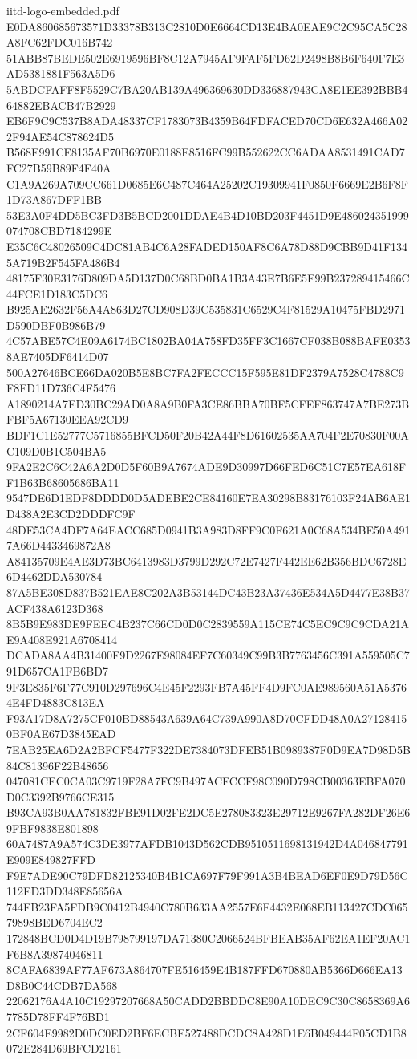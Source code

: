 \begin{filecontents*}[overwrite]{iitd-logo-embedded.pdf}
E0DA860685673571D33378B313C2810D0E6664CD13E4BA0EAE9C2C95CA5C28A8FC62FDC016B742
51ABB87BEDE502E6919596BF8C12A7945AF9FAF5FD62D2498B8B6F640F7E3AD5381881F563A5D6
5ABDCFAFF8F5529C7BA20AB139A496369630DD336887943CA8E1EE392BBB464882EBACB47B2929
EB6F9C9C537B8ADA48337CF1783073B4359B64FDFACED70CD6E632A466A022F94AE54C878624D5
B568E991CE8135AF70B6970E0188E8516FC99B552622CC6ADAA8531491CAD7FC27B59B89F4F40A
C1A9A269A709CC661D0685E6C487C464A25202C19309941F0850F6669E2B6F8F1D73A867DFF1BB
53E3A0F4DD5BC3FD3B5BCD2001DDAE4B4D10BD203F4451D9E486024351999074708CBD7184299E
E35C6C48026509C4DC81AB4C6A28FADED150AF8C6A78D88D9CBB9D41F1345A719B2F545FA486B4
48175F30E3176D809DA5D137D0C68BD0BA1B3A43E7B6E5E99B237289415466C44FCE1D183C5DC6
B925AE2632F56A4A863D27CD908D39C535831C6529C4F81529A10475FBD2971D590DBF0B986B79
4C57ABE57C4E09A6174BC1802BA04A758FD35FF3C1667CF038B088BAFE03538AE7405DF6414D07
500A27646BCE66DA020B5E8BC7FA2FECCC15F595E81DF2379A7528C4788C9F8FD11D736C4F5476
A1890214A7ED30BC29AD0A8A9B0FA3CE86BBA70BF5CFEF863747A7BE273BFBF5A67130EEA92CD9
BDF1C1E52777C5716855BFCD50F20B42A44F8D61602535AA704F2E70830F00AC109D0B1C504BA5
9FA2E2C6C42A6A2D0D5F60B9A7674ADE9D30997D66FED6C51C7E57EA618FF1B63B68605686BA11
9547DE6D1EDF8DDDD0D5ADEBE2CE84160E7EA30298B83176103F24AB6AE1D438A2E3CD2DDDFC9F
48DE53CA4DF7A64EACC685D0941B3A983D8FF9C0F621A0C68A534BE50A4917A66D4433469872A8
A84135709E4AE3D73BC6413983D3799D292C72E7427F442EE62B356BDC6728E6D4462DDA530784
87A5BE308D837B521EAE8C202A3B53144DC43B23A37436E534A5D4477E38B37ACF438A6123D368
8B5B9E983DE9FEEC4B237C66CD0D0C2839559A115CE74C5EC9C9C9CDA21AE9A408E921A6708414
DCADA8AA4B31400F9D2267E98084EF7C60349C99B3B7763456C391A559505C791D657CA1FB6BD7
9F3E835F6F77C910D297696C4E45F2293FB7A45FF4D9FC0AE989560A51A53764E4FD4883C813EA
F93A17D8A7275CF010BD88543A639A64C739A990A8D70CFDD48A0A271284150BF0AE67D3845EAD
7EAB25EA6D2A2BFCF5477F322DE7384073DFEB51B0989387F0D9EA7D98D5B84C81396F22B48656
047081CEC0CA03C9719F28A7FC9B497ACFCCF98C090D798CB00363EBFA070D0C3392B9766CE315
B93CA93B0AA781832FBE91D02FE2DC5E278083323E29712E9267FA282DF26E69FBF9838E801898
60A7487A9A574C3DE3977AFDB1043D562CDB9510511698131942D4A046847791E909E849827FFD
F9E7ADE90C79DFD82125340B4B1CA697F79F991A3B4BEAD6EF0E9D79D56C112ED3DD348E85656A
744FB23FA5FDB9C0412B4940C780B633AA2557E6F4432E068EB113427CDC06579898BED6704EC2
172848BCD0D4D19B798799197DA71380C2066524BFBEAB35AF62EA1EF20AC1F6B8A39874046811
8CAFA6839AF77AF673A864707FE516459E4B187FFD670880AB5366D666EA13D8B0C44CDB7DA568
22062176A4A10C19297207668A50CADD2BBDDC8E90A10DEC9C30C8658369A67785D78FF4F76BD1
2CF604E9982D0DC0ED2BF6ECBE527488DCDC8A428D1E6B049444F05CD1B8072E284D69BFCD2161

\end{filecontents*}
